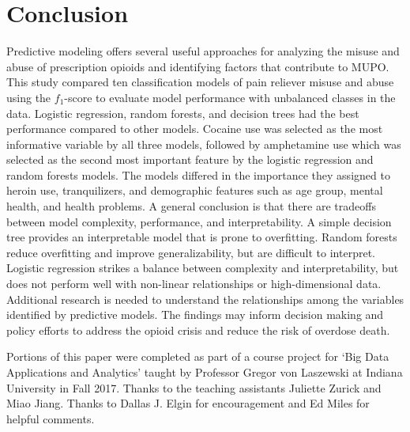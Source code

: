\documentclass[sigconf]{acmart}
\begin{document}

\section{Conclusion}

Predictive modeling offers several useful approaches for analyzing the misuse
and abuse of prescription opioids and identifying factors that contribute to 
MUPO. This study compared ten classification models of pain reliever misuse 
and abuse using the $f_1$-score to evaluate model performance with unbalanced 
classes in the data. Logistic regression, random forests, and decision trees 
had the best performance compared to other models. Cocaine use was selected 
as the most informative variable by all three models, followed by amphetamine 
use which was selected as the second most important feature by the logistic
regression and random forests models. The models differed in  the importance 
they assigned to heroin use, tranquilizers, and demographic features such as 
age group, mental health, and health problems. A general conclusion is that 
there are tradeoffs between model complexity, performance, and 
interpretability. A simple decision tree provides an interpretable model 
that is prone to overfitting. Random forests reduce overfitting and improve 
generalizability, but are difficult to interpret. Logistic regression strikes 
a balance between complexity and interpretability, but does not perform well
with non-linear relationships or high-dimensional data. Additional research 
is needed to understand the relationships among the variables identified by 
predictive models. The findings may inform decision making and policy efforts 
to address the opioid crisis and reduce the risk of overdose death. 

\begin{acks}

Portions of this paper were completed as part of a course project for
`Big Data Applications and Analytics' taught by Professor Gregor von Laszewski 
at Indiana University in Fall 2017. Thanks to the teaching assistants Juliette 
Zurick and Miao Jiang. Thanks to Dallas J. Elgin for encouragement and 
Ed Miles for helpful comments. 

\end{acks}

 
\end{document}
